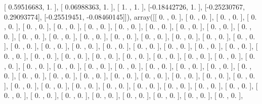 \documentclass{article}
\begin{document}
       [ 0.59516683,  1.        ],
       [ 0.06988363,  1.        ],
       [ 1.        ,  1.        ],
       [-0.18442726,  1.        ],
       [-0.25230767,  0.29093774],
       [-0.25519451, -0.08460145]]), array([[ 0.        ,  0.        ],
       [ 0.        ,  0.        ],
       [ 0.        ,  0.        ],
       [ 0.        ,  0.        ],
       [ 0.        ,  0.        ],
       [ 0.        ,  0.        ],
       [ 0.        ,  0.        ],
       [ 0.        ,  0.        ],
       [ 0.        ,  0.        ],
       [ 0.        ,  0.        ],
       [ 0.        ,  0.        ],
       [ 0.        ,  0.        ],
       [ 0.        ,  0.        ],
       [ 0.        ,  0.        ],
       [ 0.        ,  0.        ],
       [ 0.        ,  0.        ],
       [ 0.        ,  0.        ],
       [ 0.        ,  0.        ],
       [ 0.        ,  0.        ],
       [ 0.        ,  0.        ],
       [ 0.        ,  0.        ],
       [ 0.        ,  0.        ],
       [ 0.        ,  0.        ],
       [ 0.        ,  0.        ],
       [ 0.        ,  0.        ],
       [ 0.        ,  0.        ],
       [ 0.        ,  0.        ],
       [ 0.        ,  0.        ],
       [ 0.        ,  0.        ],
       [ 0.        ,  0.        ],
       [ 0.        ,  0.        ],
       [ 0.        ,  0.        ],
       [ 0.        ,  0.        ],
       [ 0.        ,  0.        ],
       [ 0.        ,  0.        ],
       [ 0.        ,  0.        ],
       [ 0.        ,  0.        ],
       [ 0.        ,  0.        ],
       [ 0.        ,  0.        ],
       [ 0.        ,  0.        ],
       [ 0.        ,  0.        ],
       [ 0.        ,  0.        ],
       [ 0.        ,  0.        ],
       [ 0.        ,  0.        ],
       [ 0.        ,  0.        ],
       [ 0.        ,  0.        ],
       [ 0.        ,  0.        ],
       [ 0.        ,  0.        ],
       [ 0.        ,  0.        ],
       [ 0.        ,  0.        ],
       [ 0.        ,  0.        ],
       [ 0.        ,  0.        ],
       [ 0.        ,  0.        ],
       [ 0.        ,  0.        ],
       [ 0.        ,  0.        ],
       [ 0.        ,  0.        ],
       [ 0.        ,  0.        ],
       [ 0.        ,  0.        ],
       [ 0.        ,  0.        ],
       [ 0.        ,  0.        ],
       [ 0.        ,  0.        ],
       [ 0.        ,  0.        ],
       [ 0.        ,  0.        ],
       [ 0.        ,  0.        ],
       [ 0.        ,  0.        ],
       [ 0.        ,  0.        ],
       [ 0.        ,  0.        ],
       [ 0.        ,  0.        ],
       [ 0.        ,  0.        ],
\end{document}

